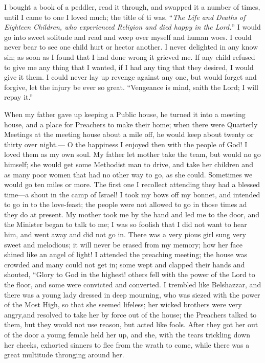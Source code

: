 \documentclass{article}
\begin{document}
I bought a book of a peddler, read it through, and swapped it a number of times, until I came to one I loved much; the title of ti was, ``\textit{The Life and Deaths of Eighteen Children, who experienced Religion and died happy in the Lord.}''
I would go into sweet solitude and read and weep over myself and human woes.
I could never bear to see one child hurt or hector another.
I never delighted in any know sin; as soon as I found that I had done wrong it grieved me.
If any child refused to give me any thing that I wanted, if I had any ting that they desired, I would give it them.
I could never lay up revenge against any one, but would forget and forgive, let the injury be ever so great.
``Vengeance is mind, saith the Lord; I will repay it.''

When my father gave up keeping a Public house, he turned it into a meeting house, and a place for Preachers to make their home; when there were Quarterly Meetings at the meeting house about a mile off, he would keep about twenty or thirty over night.---
O the happiness I enjoyed then with the people of God!
I loved them as my own soul.
My father let mother take the team, but would no go himself; she would get some Methodist man to drive, and take her children and as many poor women that had no other way to go, as she could.
Sometimes we would go ten miles or more.
The first one I recollect attending they had a blessed time---a shout in the camp of Israel!
I took my bows off my bonnet, and intended to go in to the love-feast; the people were not allowed to go in those times ad they do at present.
My mother took me by the hand and led me to the door, and the Minister began to talk to me; I was so foolish that I did not want to hear him, and went away and did not go in.
There was a very pious girl sung very sweet and melodious; it will never be erased from my memory; how her face shined like an angel of light!
I attended the preaching meeting; the house was crowded and many could not get in; some wept and clapped their hands and shouted, ``Glory to God in the  highest! others fell with the power of the Lord to the floor, and some were convicted and converted.
I trembled like Belshazzar, and there was a young lady dressed in deep mourning, who was siezed with the power of the Most High, so that she seemed lifeless; her wicked brothers were very angry,and resolved to take her by force out of the house; the Preachers talked to them, but they would not use reason, but acted like fools.
After they got her out of the door a young female held her up, and she, with the tears trickling down her cheeks, exhorted sinners to flee from the wrath to come, while there was a great multitude thronging around her.
\end{document}
